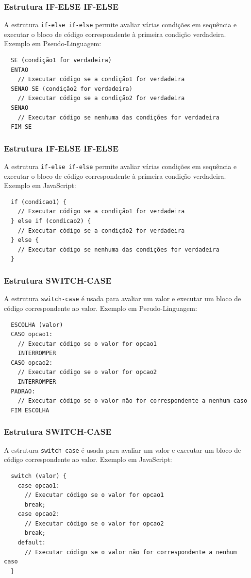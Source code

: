\documentclass[13pt, xcolor={dvipsnames,svgnames}, portuguese]{beamer}
\begin{document}
\begin{frame}[fragile]
  \frametitle{Estrutura IF-ELSE IF-ELSE}
  A estrutura \texttt{if-else if-else} permite avaliar várias condições em sequência e executar o bloco de código correspondente à primeira condição verdadeira.
  \newline
  Exemplo em Pseudo-Linguagem:
  \begin{verbatim}
  SE (condição1 for verdadeira)
  ENTAO
    // Executar código se a condição1 for verdadeira
  SENAO SE (condição2 for verdadeira)
    // Executar código se a condição2 for verdadeira
  SENAO
    // Executar código se nenhuma das condições for verdadeira
  FIM SE
  \end{verbatim}
\end{frame}

\begin{frame}[fragile]
  \frametitle{Estrutura IF-ELSE IF-ELSE}
  A estrutura \texttt{if-else if-else} permite avaliar várias condições em sequência e executar o bloco de código correspondente à primeira condição verdadeira.
  \newline
  Exemplo em JavaScript:
  \begin{verbatim}
  if (condicao1) {
    // Executar código se a condição1 for verdadeira
  } else if (condicao2) {
    // Executar código se a condição2 for verdadeira
  } else {
    // Executar código se nenhuma das condições for verdadeira
  }
  \end{verbatim}
\end{frame}

\begin{frame}[fragile]
  \frametitle{Estrutura SWITCH-CASE}
  A estrutura \texttt{switch-case} é usada para avaliar um valor e executar um bloco de código correspondente ao valor.
  \newline
  Exemplo em Pseudo-Linguagem:
  \begin{verbatim}
  ESCOLHA (valor)
  CASO opcao1:
    // Executar código se o valor for opcao1
    INTERROMPER
  CASO opcao2:
    // Executar código se o valor for opcao2
    INTERROMPER
  PADRAO:
    // Executar código se o valor não for correspondente a nenhum caso
  FIM ESCOLHA
  \end{verbatim}
\end{frame}

\begin{frame}[fragile]
  \frametitle{Estrutura SWITCH-CASE}
  A estrutura \texttt{switch-case} é usada para avaliar um valor e executar um bloco de código correspondente ao valor.
  \newline
  Exemplo em JavaScript:
  \begin{verbatim}
  switch (valor) {
    case opcao1:
      // Executar código se o valor for opcao1
      break;
    case opcao2:
      // Executar código se o valor for opcao2
      break;
    default:
      // Executar código se o valor não for correspondente a nenhum caso
  }
  \end{verbatim}
\end{frame}
\end{document}
